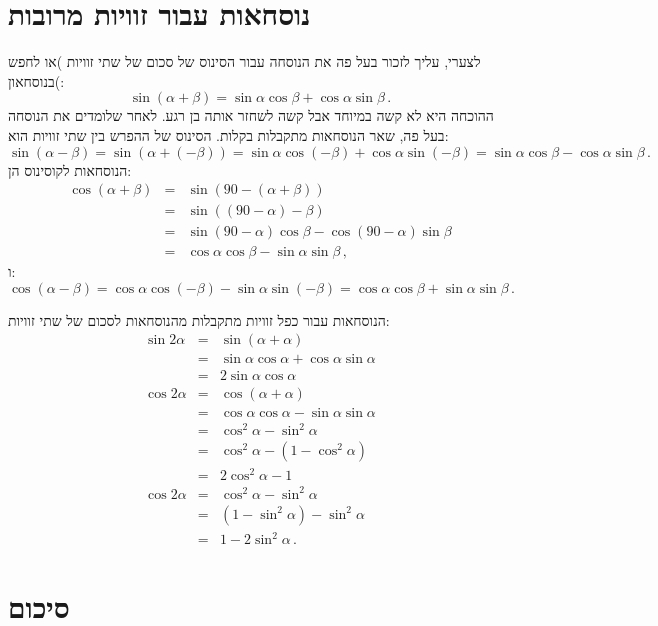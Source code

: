 \documentclass[12pt,a4paper]{article}
\begin{document}

\section{נוסחאות עבור זוויות מרובות}

לצערי, עליך לזכור בעל פה את הנוסחה עבור הסינוס של סכום של שתי זוויות )או לחפש בנוסחאון(:
\[
\sin(\alpha+\beta)=\sin\alpha\cos\beta+\cos\alpha\sin\beta\,.
\]
ההוכחה היא לא קשה במיוחד אבל קשה לשחזר אותה בן רגע. לאחר שלומדים את הנוסחה בעל פה, שאר הנוסחאות מתקבלות בקלות. הסינוס של ההפרש בין שתי זוויות הוא:
\[
\sin(\alpha-\beta)=\sin(\alpha+(-\beta))=\sin\alpha\cos(-\beta)+\cos\alpha\sin(-\beta) = 
\sin\alpha\cos\beta-\cos\alpha\sin\beta\,.
\]
הנוסחאות לקוסינוס הן:
\begin{eqnarray*}
\cos(\alpha+\beta)&=&\sin(90-(\alpha+\beta))\\
&=& \sin((90-\alpha)-\beta)\\
&=& \sin(90-\alpha)\cos\beta-\cos(90-\alpha)\sin\beta\\
&=&\cos\alpha\cos\beta - \sin\alpha\sin\beta\,,
\end{eqnarray*}
ו:
\[
\cos(\alpha-\beta) = \cos\alpha\cos(-\beta) - \sin\alpha\sin(-\beta) = 
\cos\alpha\cos\beta + \sin\alpha\sin\beta\,.
\]

הנוסחאות עבור כפל זוויות מתקבלות מהנוסחאות לסכום של שתי זוויות:
\begin{eqnarray*}
\sin 2\alpha &=& \sin(\alpha+\alpha)\\
&=& \sin\alpha\cos\alpha+\cos\alpha\sin\alpha\\
&=& 2\sin\alpha\cos\alpha\\
\cos 2\alpha &=& \cos(\alpha+\alpha)\\
&=& \cos\alpha\cos\alpha - \sin\alpha\sin\alpha\\
&=& \cos^2\alpha-\sin^2\alpha\\
&=& \cos^2\alpha- (1-\cos^2\alpha)\\
&=& 2\cos^2\alpha-1\\
\cos 2\alpha &=& \cos^2\alpha-\sin^2\alpha\\
&=& (1-\sin^2\alpha) -\sin^2\alpha\\
&=&  1-2\sin^2\alpha\,.
\end{eqnarray*}


\section{סיכום}
\end{document}
